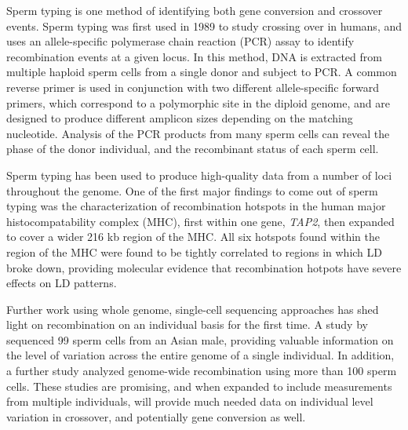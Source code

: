 Sperm typing is one method of identifying both gene conversion and crossover events.
Sperm typing was first used in 1989 to study crossing over in humans\cite{Cui1989}, and uses
an allele-specific polymerase chain reaction (PCR) assay to identify recombination events at a given locus.
In this method, DNA is extracted from multiple haploid sperm cells from a single donor and subject to PCR.
A common reverse primer is used in conjunction with two different allele-specific forward primers, which correspond to a polymorphic site in the diploid genome, and are designed to produce different amplicon sizes depending on the matching nucleotide.
Analysis of the PCR products from many sperm cells can reveal the phase of the donor individual, and the recombinant status of each sperm cell.

Sperm typing has been used to produce high-quality data from a number of loci throughout the genome.
One of the first major findings to come out of sperm typing was the characterization of recombination hotspots in the human major histocompatability complex (MHC), first within one gene, \textit{TAP2}\cite{Jeffreys2000}, then expanded to cover a wider 216 kb region of the MHC\cite{Jeffreys2001}.
All six hotspots found within the region of the MHC were found to be tightly correlated to regions in which LD broke down, providing molecular evidence that recombination hotpots have severe effects on LD patterns.



Further work using whole genome, single-cell sequencing approaches has shed light on recombination on an individual basis for the first time.
A study by \citet{Lu2012} sequenced 99 sperm cells from an Asian male, providing valuable information on the level of variation across the entire genome of a single individual.
In addition, a further study analyzed genome-wide recombination using more than 100 sperm cells\cite{Wang2012}.
These studies are promising, and when expanded to include measurements from multiple individuals, will provide much needed data on individual level variation in crossover, and potentially gene conversion as well.


